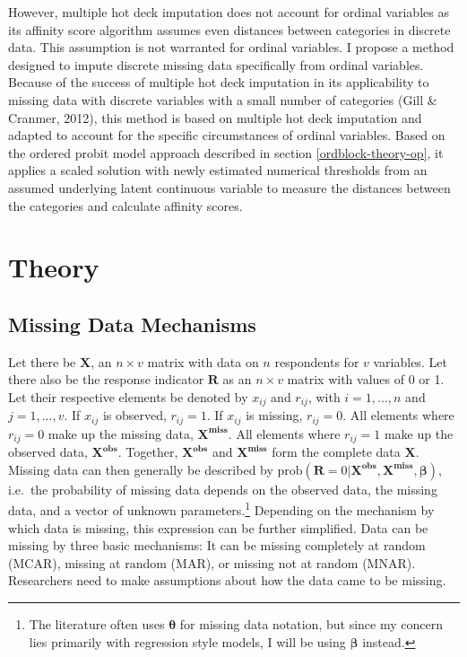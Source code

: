 \documentclass[12pt,econ]{sources/authesis}
\begin{document}
However, multiple hot deck imputation does not account for ordinal variables as its affinity score algorithm assumes even distances between categories in discrete data. This assumption is not warranted for ordinal variables. I propose a method designed to impute discrete missing data specifically from ordinal variables. Because of the success of multiple hot deck imputation in its applicability to missing data with discrete variables with a small number of categories (Gill \& Cranmer, 2012), this method is based on multiple hot deck imputation and adapted to account for the specific circumstances of ordinal variables. Based on the ordered probit model approach described in section \ref{ordblock-theory-op}, it applies a scaled solution with newly estimated numerical thresholds from an assumed underlying latent continuous variable to measure the distances between the categories and calculate affinity scores.

\hypertarget{ordmiss-theory}{%
\section{Theory}\label{ordmiss-theory}}

\hypertarget{ordmiss-theory-mechanisms}{%
\subsection{Missing Data Mechanisms}\label{ordmiss-theory-mechanisms}}

Let there be \(\bm{X}\), an \(n \times v\) matrix with data on \(n\) respondents for \(v\) variables. Let there also be the response indicator \(\bm{R}\) as an \(n \times v\) matrix with values of 0 or 1. Let their respective elements be denoted by \(x_{ij}\) and \(r_{ij}\), with \(i = 1, ..., n\) and \(j = 1, ..., v\). If \(x_{ij}\) is observed, \(r_{ij} = 1\). If \(x_{ij}\) is missing, \(r_{ij} = 0\). All elements where \(r_{ij} = 0\) make up the missing data, \(\bm{X^{miss}}\). All elements where \(r_{ij} = 1\) make up the observed data, \(\bm{X^{obs}}\). Together, \(\bm{X^{obs}}\) and \(\bm{X^{miss}}\) form the complete data \(\bm{X}\). Missing data can then generally be described by \(\text{prob}(\bm{R} = 0 | \bm{X^{obs}}, \bm{X^{miss}}, \bm{\beta})\), i.e.~the probability of missing data depends on the observed data, the missing data, and a vector of unknown parameters.\footnote{The literature often uses \(\bm{\theta}\) for missing data notation, but since my concern lies primarily with regression style models, I will be using \(\bm{\beta}\) instead.} Depending on the mechanism by which data is missing, this expression can be further simplified. Data can be missing by three basic mechanisms: It can be missing completely at random (MCAR), missing at random (MAR), or missing not at random (MNAR). Researchers need to make assumptions about how the data came to be missing.
\end{document}

